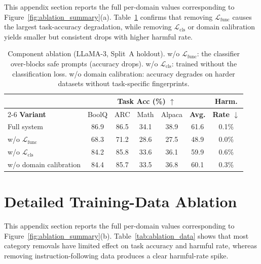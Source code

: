 {This appendix section reports the full per-domain values corresponding to Figure~\ref{fig:ablation_summary}(a). Table~\ref{tab:ablation_loss} confirms that removing $\mathcal{L}_\text{func}$ causes the largest task-accuracy degradation, while removing $\mathcal{L}_\text{cls}$ or domain calibration yields smaller but consistent drops with higher harmful rate.}
\begin{table}[htbp]
	\centering
	\small
	\renewcommand{\arraystretch}{1.0}
	\setlength{\tabcolsep}{5pt}
	\begin{tabular}{@{}lcccccc@{}}
		\toprule
		& \multicolumn{5}{c}{\textbf{Task Acc (\%) $\uparrow$}} & \textbf{Harm.} \\
		\cmidrule(lr){2-6}
		\textbf{Variant} & BoolQ & ARC & Math & Alpaca & \textbf{Avg.} & \textbf{Rate $\downarrow$} \\
		\midrule
		Full system                              & 86.9 & 86.5 & 34.1 & 38.9 & 61.6 & 0.1\% \\
		w/o $\mathcal{L}_\text{func}$ & 68.3 & 71.2 & 28.6 & 27.5 & 48.9 & 0.0\% \\
		w/o $\mathcal{L}_\text{cls}$ & 84.2 & 85.8 & 33.6 & 36.1 & 59.9 & 0.6\% \\
		w/o domain calibration                  & 84.4 & 85.7 & 33.5 & 36.8 & 60.1 & 0.3\% \\
		\bottomrule
	\end{tabular}
	\caption{Component ablation (LLaMA-3, Split~A holdout). w/o $\mathcal{L}_\text{func}$: the classifier over-blocks safe prompts (accuracy drops). w/o $\mathcal{L}_\text{cls}$: trained without the classification loss. w/o domain calibration: accuracy degrades on harder datasets without task-specific fingerprints.}
	\label{tab:ablation_loss}
\end{table}
\section{Detailed Training-Data Ablation}
\label{app:ablation_data}
{This appendix section reports the full per-domain values corresponding to Figure~\ref{fig:ablation_summary}(b). Table~\ref{tab:ablation_data} shows that most category removals have limited effect on task accuracy and harmful rate, whereas removing instruction-following data produces a clear harmful-rate spike.}

